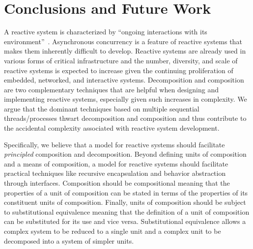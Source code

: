 \chapter{Conclusions and Future Work}
\label{conclusion}

A reactive system is characterized by ``ongoing interactions with its environment''~\cite{manna1992temporal}.
Asynchronous concurrency is a feature of reactive systems that makes them inherently difficult to develop.
Reactive systems are already used in various forms of critical infrastructure and the number, diversity, and scale of reactive systems is expected to increase given the continuing proliferation of embedded, networked, and interactive systems.
Decomposition and composition are two complementary techniques that are helpful when designing and implementing reactive systems, especially given such increases in complexity.
We argue that the dominant techniques based on multiple sequential threads/processes thwart decomposition and composition and thus contribute to the accidental complexity associated with reactive system development.

Specifically, we believe that a model for reactive systems should facilitate \emph{principled} composition and decomposition.
Beyond defining units of composition and a means of composition, a model for reactive systems should facilitate practical techniques like recursive encapsulation and behavior abstraction through interfaces.
Composition should be compositional meaning that the properties of a unit of composition can be stated in terms of the properties of its constituent units of composition.
Finally, units of composition should be subject to substitutional equivalence meaning that the definition of a unit of composition can be substituted for its use and vice versa.
Substitutional equivalence allows a complex system to be reduced to a single unit and a complex unit to be decomposed into a system of simpler units.


